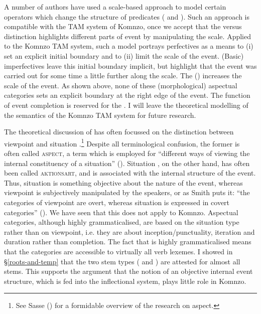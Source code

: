 A number of authors have used a scale-based approach to model certain operators which change the structure of predicates (\citealt{Kennedy:2005fy} and \citealt{Kubota:2010bx}). Such an approach is compatible with the TAM system of Komnzo, once we accept that the  versus  distinction highlights different parts of event by manipulating the  scale. Applied to the Komnzo TAM system, such a model portrays perfectives as a means to (i) set an explicit initial boundary and to (ii) limit the  scale of the event. (Basic) imperfectives leave this initial boundary implicit, but highlight that the event was carried out for some time \textendash{} a little further along the scale. The  () increases the  scale of the event. As shown above, none of these (morphological) aspectual categories sets an explicit boundary at the right edge of the event. The function of event completion is reserved for the  . I will leave the theoretical modelling of the semantics of the Komnzo TAM system for future research.

The theoretical discussion of  has often focussed on the distinction between viewpoint  and situation .\footnote{See Sasse (\citeyear{Sasse:2002vn}) for a formidable overview of the research on aspect.} Despite all terminological confusion, the former is often called \textsc{aspect}, a term which is employed for ``different ways of viewing the internal constituency of a situation'' (\citealt[3]{Comrie:1976vd}). Situation , on the other hand, has often been called \textsc{aktionsart}, and is associated with the internal structure of the event. Thus, situation  is something objective about the nature of the event, whereas viewpoint  is subjectively manipulated by the speakers, or as Smith puts it: ``the categories of viewpoint  are overt, whereas situation  is expressed in covert categories'' (\citeyear[5]{Smith:1997tq}). We have seen that this does not apply to Komnzo. Aspectual categories, although highly grammaticalised, are based on the situation type rather than on viewpoint, i.e. they are about inception/punctuality, iteration and duration rather than completion. The fact that  is highly grammaticalised means that the categories are accessible to virtually all verb lexemes. I showed in {\S}\ref{roots-and-temp} that the two stem types ({\Rs} and {\Ext}) are attested for almost all stems. This supports the argument that the notion of an objective internal event structure, which is fed into the inflectional system, plays little role in Komnzo.

